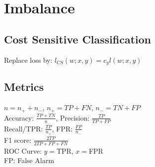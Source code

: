 \section*{Imbalance}

\subsection*{Cost Sensitive Classification}
Replace loss by: $l_{CS}(w;x,y) = c_y l(w;x,y)$

\subsection*{Metrics}
$n = n_+ + n_-$, $n_+ = TP + FN$, $n_- = TN + FP$\\
Accuracy: $\frac{TP+TN}{n}$, 
Precision: $\frac{TP}{TP+FP}$\\ 
Recall/TPR: $\frac{TP}{n_+}$, 
FPR: $ \frac{FP}{n_-}$\\
F1 score: $\frac{2TP}{2TP+FP+FN}$\\
ROC Curve: $y = $TPR, $x = $FPR\\
FP: False Alarm